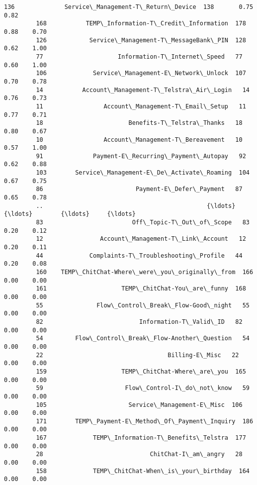 \documentclass[11pt]{article}
\begin{document}
\begin{Verbatim}[commandchars=\\\{\}]
         136              Service\_Management-T\_Return\_Device  138       0.75    0.82   
         168           TEMP\_Information-T\_Credit\_Information  178       0.88    0.70   
         126            Service\_Management-T\_MessageBank\_PIN  128       0.62    1.00   
         77                     Information-T\_Internet\_Speed   77       0.60    1.00   
         106             Service\_Management-E\_Network\_Unlock  107       0.70    0.78   
         14           Account\_Management-T\_Telstra\_Air\_Login   14       0.76    0.73   
         11                 Account\_Management-T\_Email\_Setup   11       0.77    0.71   
         18                        Benefits-T\_Telstra\_Thanks   18       0.80    0.67   
         10                 Account\_Management-T\_Bereavement   10       0.57    1.00   
         91              Payment-E\_Recurring\_Payment\_Autopay   92       0.62    0.88   
         103        Service\_Management-E\_De\_Activate\_Roaming  104       0.67    0.75   
         86                          Payment-E\_Defer\_Payment   87       0.65    0.78   
         ..                                              {\ldots}  {\ldots}        {\ldots}     {\ldots}   
         83                         Off\_Topic-T\_Out\_of\_Scope   83       0.20    0.12   
         12                Account\_Management-T\_Link\_Account   12       0.20    0.11   
         44             Complaints-T\_Troubleshooting\_Profile   44       0.20    0.08   
         160    TEMP\_ChitChat-Where\_were\_you\_originally\_from  166       0.00    0.00   
         161                     TEMP\_ChitChat-You\_are\_funny  168       0.00    0.00   
         55               Flow\_Control\_Break\_Flow-Good\_night   55       0.00    0.00   
         82                           Information-T\_Valid\_ID   82       0.00    0.00   
         54         Flow\_Control\_Break\_Flow-Another\_Question   54       0.00    0.00   
         22                                   Billing-E\_Misc   22       0.00    0.00   
         159                     TEMP\_ChitChat-Where\_are\_you  165       0.00    0.00   
         59                       Flow\_Control-I\_do\_not\_know   59       0.00    0.00   
         105                       Service\_Management-E\_Misc  106       0.00    0.00   
         171        TEMP\_Payment-E\_Method\_Of\_Payment\_Inquiry  186       0.00    0.00   
         167             TEMP\_Information-T\_Benefits\_Telstra  177       0.00    0.00   
         28                              ChitChat-I\_am\_angry   28       0.00    0.00   
         158             TEMP\_ChitChat-When\_is\_your\_birthday  164       0.00    0.00   

\end{Verbatim}
\end{document}
